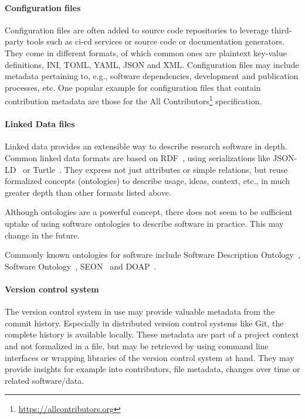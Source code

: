 \documentclass[11pt,a4paper]{scrartcl}
\begin{document}
\paragraph{Configuration files}\label{par:metadata-formats-config}
Configuration files are often added to source code repositories to leverage third-party tools such as \gls{ci-cd} services or source code or documentation generators. They come in different formats, of which common ones are plaintext key-value definitions, INI, TOML, YAML, JSON and XML. Configuration files may include metadata pertaining to, e.g., software dependencies, development and publication processes, etc. One popular example for configuration files that contain contribution metadata are those for the All Contributors\footnote{\url{https://allcontributors.org}} specification.

\paragraph{Linked Data files}\label{par:metadata-formats-linked-data}
Linked data provides an extensible way to describe research software in depth. Common linked data formats are based on RDF~\cite{W3C-RDF}, using serializations like JSON-LD~\cite{W3C-JSON-LD} or Turtle~\cite{W3C-RDF-Turtle}. They express not just attributes or simple relations, but reuse formalized concepts (ontologies) to describe usage, ideas, context, etc., in much greater depth than other formats listed above.

Although ontologies are a powerful concept, there does not seem to be sufficient uptake of using software ontologies to describe software in practice. This may change in the future.

Commonly known ontologies for software include Software Description Ontology~\cite{SoftDescOnto}, Software Ontology~\cite{SoftwareOntology}, SEON~\cite{SeonOntology} and DOAP~\cite{DoapOntology}.

\paragraph{Version control system}\label{par:metadata-formats-vcs}
The version control system in use may provide valuable metadata from the commit history. Especially in distributed version control systems like Git, 
the complete history is available locally. These metadata are part of a project context and not formalized in a file, but may be retrieved by using command
line interfaces or wrapping libraries of the version control system at hand. They may provide insights for example into contributors, file metadata,
changes over time or related software/data.
\end{document}
